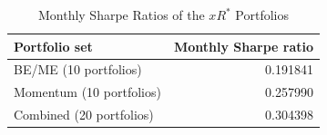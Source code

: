 \begin{table}[H]
  \centering
  \caption{Monthly Sharpe Ratios of the $xR^*$ Portfolios}
  \label{tab:2c-sharpe-ratios}
  \begin{tabular}{lr}
    \toprule
    Portfolio set & Monthly Sharpe ratio \\
    \midrule
    BE/ME (10 portfolios) & 0.191841 \\
    Momentum (10 portfolios) & 0.257990 \\
    Combined (20 portfolios) & 0.304398 \\
    \bottomrule
  \end{tabular}
\end{table}
